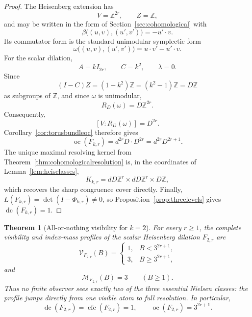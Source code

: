\documentclass[11pt]{article}
\newtheorem{theorem}{Theorem}[section]
\DeclareMathOperator{\oc}{oc}
\DeclareMathOperator{\dc}{dc}
\DeclareMathOperator{\cfc}{cfc}
\newcommand{\VN}{\mathcal V}
\newcommand{\MN}{\mathcal M}
\newcommand{\Z}{\mathbb Z}
\begin{document}
\begin{proof}
The Heisenberg extension has
\[
  V=\Z^{2r},
  \qquad
  Z=\Z,
\]
and may be written in the form of Section~\ref{sec:cohomological} with
\[
  \beta\bigl((u,v),(u',v')\bigr)=-u'\!\cdot v.
\]
Its commutator form is the standard unimodular symplectic form
\[
  \omega\bigl((u,v),(u',v')\bigr)
  =u\!\cdot v'-u'\!\cdot v.
\]
For the scalar dilation,
\[
  A=kI_{2r},
  \qquad
  C=k^2,
  \qquad
  \lambda=0.
\]
Since
\[
  (I-C)Z=(1-k^2)\Z=(k^2-1)\Z=D\Z
\]
as subgroups of $\Z$, and since $\omega$ is unimodular,
\[
  R_D(\omega)=D\Z^{2r}.
\]
Consequently,
\[
  [V:R_D(\omega)]=D^{2r}.
\]
Corollary~\ref{cor:torusbundleoc} therefore gives
\[
  \oc(F_{k,r})
  =d^{2r}D\cdot D^{2r}
  =d^{2r}D^{2r+1}.
\]
The unique maximal resolving kernel from
Theorem~\ref{thm:cohomologicalresolution} is, in the coordinates of
Lemma~\ref{lem:heisclasses},
\[
  K_{k,r}=dD\Z^r\times dD\Z^r\times D\Z,
\]
which recovers the sharp congruence cover directly.  Finally,
$L(F_{k,r})=\det(I-\Phi_{k,r})\ne0$, so
Proposition~\ref{prop:threelevels} gives $\dc(F_{k,r})=1$.
\end{proof}

\begin{theorem}[All-or-nothing visibility for $k=2$]
\label{thm:heisprofilek2}
For every $r\ge1$, the complete visibility and index-mass profiles of the
scalar Heisenberg dilation $F_{2,r}$ are
\[
  \boxed{
  \VN_{F_{2,r}}(B)=
  \begin{cases}
    1,&B<3^{2r+1},\\[1mm]
    3,&B\ge3^{2r+1},
  \end{cases}}
\]
and
\[
  \MN_{F_{2,r}}(B)=3
  \qquad(B\ge1).
\]
Thus no finite observer sees exactly two of the three essential Nielsen
classes: the profile jumps directly from one visible atom to full resolution.
In particular,
\[
  \dc(F_{2,r})=\cfc(F_{2,r})=1,
  \qquad
  \oc(F_{2,r})=3^{2r+1}.
\]
\end{theorem}
\end{document}
